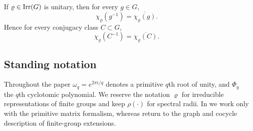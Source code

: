 \begin{remark}
  \label{rem:character-inversion-conjugation}
  If \(\varrho\in\operatorname{Irr}(G)\) is unitary, then for every \(g\in G\),
  \[
    \chi_\varrho(g^{-1})
    =\overline{\chi_\varrho(g)}.
  \]
  Hence for every conjugacy class \(C\subset G\),
  \[
    \chi_\varrho(C^{-1})
    =\overline{\chi_\varrho(C)}.
  \]
\end{remark}

\subsection{Standing notation}

Throughout the paper \(\omega_q=e^{2\pi i/q}\) denotes a primitive
\(q\)th root of unity, and \(\Phi_q\) the \(q\)th cyclotomic
polynomial. We reserve the notation \(\varrho\) for irreducible
representations of finite groups and keep \(\rho(\cdot)\) for spectral
radii. In  we work only with the primitive matrix
formalism, whereas  return to the
graph and cocycle description of finite-group extensions.
